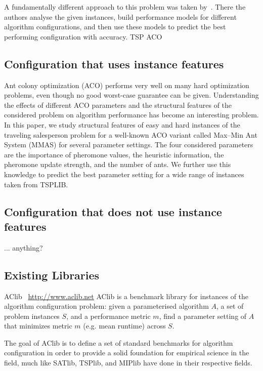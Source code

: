 \documentclass{article}
\begin{document}
A fundamentally different approach to this problem was taken by~\cite{Nallaperuma2015antsTsp}. 
There the authors analyse the given instances, build performance models for different algorithm configurations, and then use these models to predict the best performing configuration with accuracy. TSP ACO


\subsection{Configuration that uses instance features}

\cite{Nallaperuma2015antsTsp}
Ant colony optimization (ACO) performs very well on many hard optimization problems, even though no good worst-case guarantee can be given. Understanding the effects of different ACO parameters and the structural features of the considered problem on algorithm performance has become an interesting problem. In this paper, we study structural features of easy and hard instances of the traveling salesperson problem for a well-known ACO variant called Max–Min Ant System (MMAS) for several parameter settings. The four considered parameters are the importance of pheromone values, the heuristic information, the pheromone update strength, and the number of ants. We further use this knowledge to predict the best parameter setting for a wide range of instances taken from TSPLIB.

\subsection{Configuration that does not use instance features}

... anything?



\subsection{Existing Libraries}

AClib~\cite{DBLP:conf/lion/HutterLFLHLS14} \url{http://www.aclib.net}
AClib is a benchmark library for instances of the algorithm configuration problem: given a parameterised algorithm $A$, a set of problem instances $S$, and a performance metric $m$, find a parameter setting of $A$ that minimizes metric $m$ (e.g. mean runtime) across $S$. 

The goal of AClib is to define a set of standard benchmarks for algorithm configuration in order to provide a solid foundation for empirical science in the field, much like SATlib, TSPlib, and MIPlib have done in their respective fields.  
\end{document}
